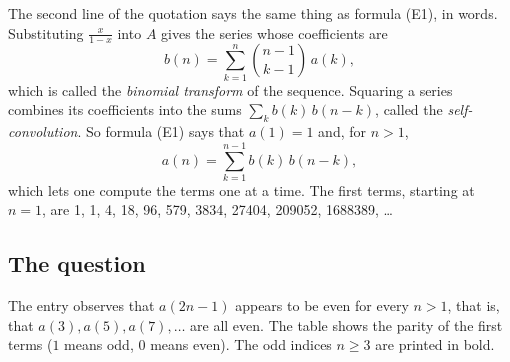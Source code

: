 \documentclass[11pt,a4paper]{article}
\theoremstyle{definition}
\theoremstyle{remark}
\begin{document}
The second line of the quotation says the same thing as formula (E1), in words. Substituting $\frac{x}{1-x}$ into $A$
gives the series whose coefficients are
\[
b(n)=\sum_{k=1}^{n}\binom{n-1}{k-1}\,a(k),
\]
which is called the \emph{binomial transform} of the sequence. Squaring a series combines its coefficients into the sums
$\sum_kb(k)\,b(n-k)$, called the \emph{self-convolution}. So formula (E1) says that $a(1)=1$ and, for $n>1$,
\[
a(n)=\sum_{k=1}^{n-1}b(k)\,b(n-k),
\]
which lets one compute the terms one at a time. The first terms, starting at $n=1$, are
1, 1, 4, 18, 96, 579, 3834, 27404, 209052, 1688389, \dots

\subsection{The question}
The entry observes that $a(2n-1)$ appears to be even for every $n>1$, that is, that $a(3),a(5),a(7),\dots$ are all even.
The table shows the parity of the first terms ($1$ means odd, $0$ means even). The odd indices $n\ge3$ are printed in
bold.
\end{document}
